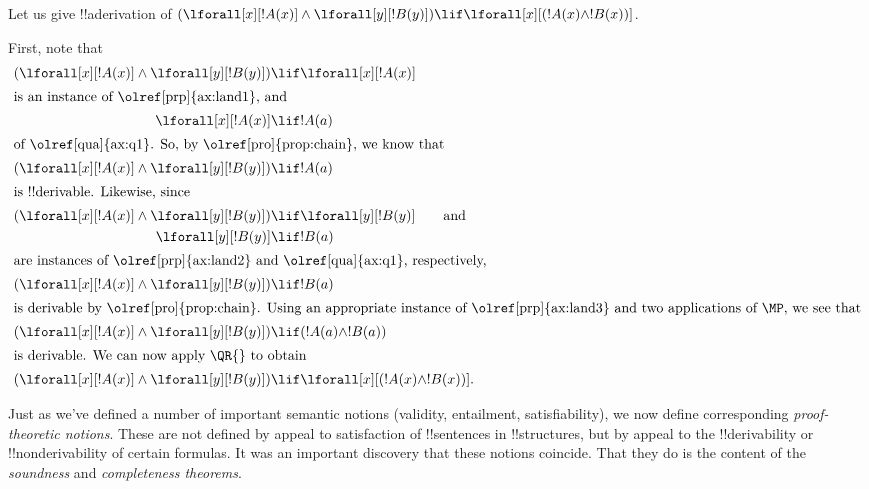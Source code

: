   



\begin{ex}
Let us give !!a{derivation} of $(\lforall[x][!A(x)] \land
\lforall[y][!B(y)]) \lif \lforall[x][(!A(x) \land !B(x))]$.

First, note that
\begin{align*}
  (\lforall[x][!A(x)] \land \lforall[y][!B(y)]) & \lif \lforall[x][!A(x)]\\
  \intertext{is an instance of \olref[prp]{ax:land1}, and}
  \lforall[x][!A(x)] & \lif !A(a) \\
  \intertext{of \olref[qua]{ax:q1}. So, by \olref[pro]{prop:chain}, we know that}
  (\lforall[x][!A(x)] \land \lforall[y][!B(y)]) & \lif !A(a) \\
  \intertext{is !!{derivable}. Likewise, since}
  (\lforall[x][!A(x)] \land \lforall[y][!B(y)]) & \lif \lforall[y][!B(y)] \qquad\text{and}\\
    \lforall[y][!B(y)] & \lif !B(a)\\
    \intertext{are instances of \olref[prp]{ax:land2} and \olref[qua]{ax:q1}, respectively,}
    (\lforall[x][!A(x)] \land \lforall[y][!B(y)]) & \lif !B(a)\\
    \intertext{is derivable by \olref[pro]{prop:chain}. Using an appropriate instance of \olref[prp]{ax:land3} and two applications of~\MP, we see that}
    (\lforall[x][!A(x)] \land \lforall[y][!B(y)]) & \lif (!A(a) \land !B(a))\\
    \intertext{is derivable. We can now apply \QR{} to obtain}
(\lforall[x][!A(x)] \land \lforall[y][!B(y)]) & \lif \lforall[x][(!A(x) \land !B(x))].
\end{align*}
\end{ex}








\begin{explain}
Just as we've defined a number of important semantic notions
(validity, entailment, satisfiability), we now
define corresponding \emph{proof-theoretic notions}.  These are not
defined by appeal to satisfaction of !!{sentence}s in !!{structure}s,
but by appeal to the !!{derivability} or !!{nonderivability} of
certain formulas.  It was an important discovery that these notions
coincide.  That they do is the content of the \emph{soundness} and
\emph{completeness theorems}.
\end{explain}


